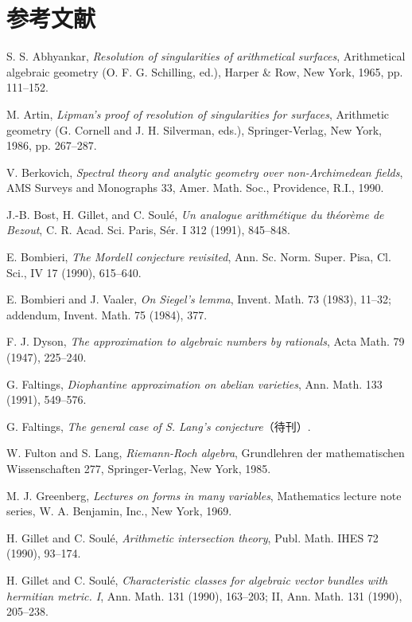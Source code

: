 \section*{参考文献}
\begin{description}[style=nextline,leftmargin=4em,font=\normalfont\bfseries]
\item[{[Ab]}] S. S. Abhyankar, \emph{Resolution of singularities of arithmetical surfaces}, Arithmetical algebraic geometry (O. F. G. Schilling, ed.), Harper \& Row, New York, 1965, pp. 111--152.
\item[{[Ar]}] M. Artin, \emph{Lipman's proof of resolution of singularities for surfaces}, Arithmetic geometry (G. Cornell and J. H. Silverman, eds.), Springer-Verlag, New York, 1986, pp. 267--287.
\item[{[Be]}] V. Berkovich, \emph{Spectral theory and analytic geometry over non-Archimedean fields}, AMS Surveys and Monographs 33, Amer. Math. Soc., Providence, R.I., 1990.
\item[{[B-G-S]}] J.-B. Bost, H. Gillet, and C. Soulé, \emph{Un analogue arithmétique du théorème de Bezout}, C. R. Acad. Sci. Paris, Sér. I 312 (1991), 845--848.
\item[{[Bo]}] E. Bombieri, \emph{The Mordell conjecture revisited}, Ann. Sc. Norm. Super. Pisa, Cl. Sci., IV 17 (1990), 615--640.
\item[{[B-V]}] E. Bombieri and J. Vaaler, \emph{On Siegel's lemma}, Invent. Math. 73 (1983), 11--32; addendum, Invent. Math. 75 (1984), 377.
\item[{[D]}] F. J. Dyson, \emph{The approximation to algebraic numbers by rationals}, Acta Math. 79 (1947), 225--240.
\item[{[F 1]}] G. Faltings, \emph{Diophantine approximation on abelian varieties}, Ann. Math. 133 (1991), 549--576.
\item[{[F 2]}] G. Faltings, \emph{The general case of S. Lang's conjecture}（待刊）.
\item[{[F-L]}] W. Fulton and S. Lang, \emph{Riemann-Roch algebra}, Grundlehren der mathematischen Wissenschaften 277, Springer-Verlag, New York, 1985.
\item[{[G]}] M. J. Greenberg, \emph{Lectures on forms in many variables}, Mathematics lecture note series, W. A. Benjamin, Inc., New York, 1969.
\item[{[G-S 1]}] H. Gillet and C. Soulé, \emph{Arithmetic intersection theory}, Publ. Math. IHES 72 (1990), 93--174.
\item[{[G-S 2]}] H. Gillet and C. Soulé, \emph{Characteristic classes for algebraic vector bundles with hermitian metric. I}, Ann. Math. 131 (1990), 163--203; II, Ann. Math. 131 (1990), 205--238.

\end{description}
